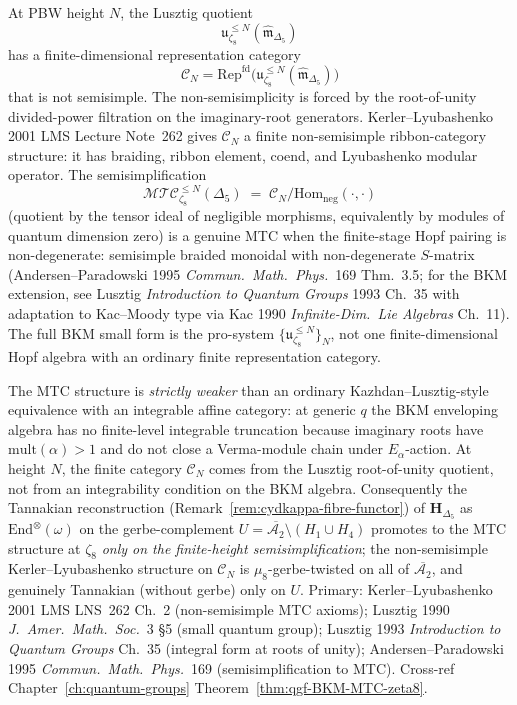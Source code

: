 \begin{remark}[Finite-height non-semisimple MTC structure at \texorpdfstring{$q=\zeta_8$}{q=zeta-8}]
\label{rem:cydkappa-mtc}
At PBW height \(N\), the Lusztig quotient
\[
\mathfrak u_{\zeta_8}^{\leq N}
(\widehat{\mathfrak m}_{\Delta_5})
\]
has a finite-dimensional representation category
\[
\mathcal C_N=
\mathrm{Rep}^{\mathrm{fd}}\bigl(
\mathfrak u_{\zeta_8}^{\leq N}
(\widehat{\mathfrak m}_{\Delta_5})\bigr)
\]
that is not semisimple. The non-semisimplicity is forced by the
root-of-unity divided-power filtration on the imaginary-root
generators. Kerler--Lyubashenko 2001 LMS Lecture Note~262 gives
\(\mathcal C_N\) a finite non-semisimple ribbon-category structure:
it has braiding, ribbon element, coend, and Lyubashenko modular
operator.
The semisimplification
\[
 \mathcal{MTC}^{\leq N}_{\zeta_8}(\Delta_5)
 \;=\;
 \mathcal C_N\big/
 \mathrm{Hom}_{\mathrm{neg}}(\cdot,\cdot)
\]
(quotient by the tensor ideal of negligible morphisms, equivalently
by modules of quantum dimension zero) is a genuine MTC when the
finite-stage Hopf pairing is non-degenerate: semisimple braided
monoidal with non-degenerate \(S\)-matrix
(Andersen--Paradowski 1995 \emph{Commun.~Math.~Phys.}~169 Thm.~3.5;
for the BKM extension, see Lusztig \emph{Introduction to Quantum
Groups} 1993 Ch.~35 with adaptation to Kac--Moody type via
Kac 1990 \emph{Infinite-Dim.~Lie Algebras} Ch.~11).
The full BKM small form is the pro-system
\(\{\mathfrak u_{\zeta_8}^{\leq N}\}_N\), not one finite-dimensional
Hopf algebra with an ordinary finite representation category.

The MTC structure is \emph{strictly weaker} than an ordinary
Kazhdan--Lusztig-style equivalence with an integrable affine category:
at generic $q$ the BKM enveloping algebra has no finite-level
integrable truncation because imaginary roots have
$\mathrm{mult}(\alpha)>1$ and do not close a Verma-module chain under
$E_\alpha$-action. At height \(N\), the finite category
\(\mathcal C_N\) comes from the Lusztig root-of-unity quotient, not
from an integrability condition on the BKM algebra. Consequently the
Tannakian reconstruction
(Remark~\ref{rem:cydkappa-fibre-functor}) of
$\mathbf H_{\Delta_5}$ as
$\mathrm{End}^{\otimes}(\omega)$ on the gerbe-complement
$U = \overline{\mathcal A_2}\setminus (H_1\cup H_4)$
promotes to the MTC structure at $\zeta_8$ \emph{only on the
finite-height semisimplification}; the non-semisimple
Kerler--Lyubashenko structure on \(\mathcal C_N\) is
$\mu_8$-gerbe-twisted on all of
$\overline{\mathcal A_2}$, and genuinely Tannakian (without gerbe) only
on $U$. Primary: Kerler--Lyubashenko 2001 LMS LNS~262 Ch.~2
(non-semisimple MTC axioms); Lusztig 1990
\emph{J.~Amer.~Math.~Soc.}~3 \S5 (small quantum group);
Lusztig 1993 \emph{Introduction to Quantum Groups} Ch.~35
(integral form at roots of unity); Andersen--Paradowski 1995
\emph{Commun.~Math.~Phys.}~169 (semisimplification to MTC). Cross-ref
Chapter~\ref{ch:quantum-groups} Theorem~\ref{thm:qgf-BKM-MTC-zeta8}.
\end{remark}

